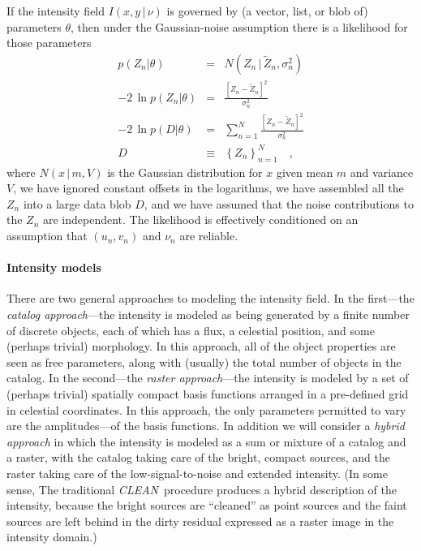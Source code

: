 \documentclass[12pt]{article}
\newcommand{\project}[1]{\textsl{#1}}
\newcommand{\CLEAN}{\project{CLEAN}}
\newcommand{\set}[1]{\left\{{#1}\right\}}
\newcommand{\given}{\,|\,}
\newcommand{\expectation}[1]{\tilde{#1}}
\newcommand{\normal}{N}
\begin{document}
If the intensity field $I(x,y\given\nu)$ is governed by (a vector,
list, or blob of) parameters $\theta$, then under the Gaussian-noise
assumption there is a likelihood for those parameters
\begin{eqnarray}
p(Z_n|\theta) &=& \normal(Z_n\given\expectation{Z}_n,\sigma_n^2)
\\
-2\,\ln p(Z_n|\theta) &=& \frac{[Z_n - \expectation{Z}_n]^2}{\sigma_n^2}
\\
-2\,\ln p(D|\theta) &=& \sum_{n=1}^N \frac{[Z_n - \expectation{Z}_n]^2}{\sigma_n^2}
\\
D &\equiv& \set{Z_n}_{n=1}^N
\quad ,
\end{eqnarray}
where $\normal(x\given m,V)$ is the Gaussian distribution for $x$
given mean $m$ and variance $V$, we have ignored constant offsets in
the logarithms, we have assembled all the $Z_n$ into a large data blob
$D$, and we have assumed that the noise contributions to the $Z_n$ are
independent.  The likelihood is effectively conditioned on an
assumption that $(u_n, v_n)$ and $\nu_n$ are reliable.

\paragraph{Intensity models}

There are two general approaches to modeling the intensity field.  In
the first---the \emph{catalog approach}---the intensity is modeled as
being generated by a finite number of discrete objects, each of which
has a flux, a celestial position, and some (perhaps trivial)
morphology.  In this approach, all of the object properties are seen
as free parameters, along with (usually) the total number of objects
in the catalog.  In the second---the \emph{raster approach}---the
intensity is modeled by a set of (perhaps trivial) spatially compact
basis functions arranged in a pre-defined grid in celestial
coordinates.  In this approach, the only parameters permitted to vary
are the amplitudes---of the basis functions.  In addition we will
consider a \emph{hybrid approach} in which the intensity is modeled as
a sum or mixture of a catalog and a raster, with the catalog taking
care of the bright, compact sources, and the raster taking care of the
low-signal-to-noise and extended intensity.  (In some sense, The
traditional \CLEAN\ procedure produces a hybrid description of the
intensity, because the bright sources are ``cleaned'' as point sources
and the faint sources are left behind in the dirty residual expressed
as a raster image in the intensity domain.)
\end{document}
